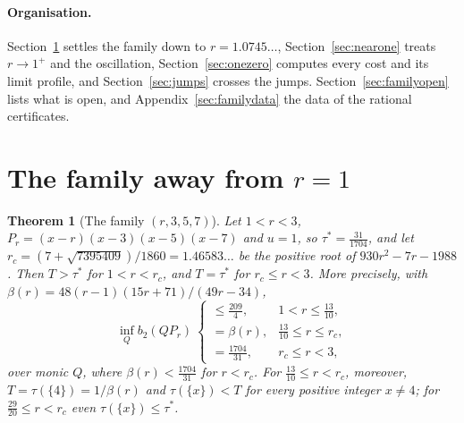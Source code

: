 \documentclass[11pt]{article}
\newtheorem{theorem}{Theorem}[section]
\begin{document}
\paragraph{Organisation.}  Section~\ref{sec:familyfar} settles the family
down to $r=1.0745\ldots$, Section~\ref{sec:nearone} treats $r\to1^+$ and
the oscillation, Section~\ref{sec:onezero} computes every cost and its limit
profile, and Section~\ref{sec:jumps} crosses the jumps.
Section~\ref{sec:familyopen} lists what is open, and
Appendix~\ref{sec:familydata} the data of the rational certificates.

\section{The family away from \texorpdfstring{$r=1$}{r=1}}\label{sec:familyfar}

\begin{theorem}[The family $(r,3,5,7)$]\label{thm:family}
Let $1<r<3$, $P_r=(x-r)(x-3)(x-5)(x-7)$ and $u=1$, so $\tau^*=\tfrac{31}{1704}$,
and let $r_c=(7+\sqrt{7395409})/1860=1.46583\ldots$ be the positive root of
$930r^2-7r-1988$.  Then $T>\tau^*$ for $1<r<r_c$, and $T=\tau^*$ for
$r_c\le r<3$.  More precisely, with $\beta(r)=48(r-1)(15r+71)/(49r-34)$,
\[
  \inf_Qb_2(QP_r)\ \begin{cases}
    \le\tfrac{209}{4}, & 1<r\le\tfrac{13}{10},\\[2pt]
    =\beta(r), & \tfrac{13}{10}\le r\le r_c,\\[2pt]
    =\tfrac{1704}{31}, & r_c\le r<3,
  \end{cases}
\]
over monic $Q$, where $\beta(r)<\tfrac{1704}{31}$ for $r<r_c$.  For
$\tfrac{13}{10}\le r<r_c$, moreover, $T=\tau(\{4\})=1/\beta(r)$ and
$\tau(\{x\})<T$ for every positive integer $x\ne4$; for
$\tfrac{29}{20}\le r<r_c$ even $\tau(\{x\})\le\tau^*$.
\end{theorem}
\end{document}
